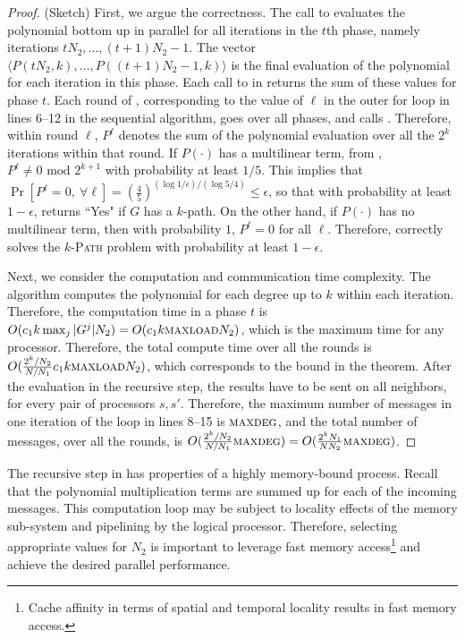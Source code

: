 \begin{proof} (Sketch)
First, we argue the correctness. 
The call to \parcircuitpath{} evaluates the polynomial bottom up in parallel for all iterations in the
$t$th phase, namely iterations $tN_2,\ldots,(t+1)N_2-1$. The vector
$\langle P(tN_2, k),  \ldots ,P((t+1)N_2-1, k)\rangle$
is the final evaluation of the polynomial for each iteration in this phase.
Each call to \parcircuitpath{} in \ouralgo{}
returns the sum of these values for phase $t$.
Each round of \ouralgo{}, corresponding to the value of
$\ell$ in the outer for loop in lines 6--12 in the sequential algorithm, goes over all phases, and
calls \parcircuitpath{}. Therefore, within round $\ell$, $P^{\ell}$ denotes the
sum of the polynomial evaluation over all the $2^k$ iterations within that round.
If $P(\cdot)$ has a multilinear term,
from \cite{koutis:icalp08,williams2009finding}, $P^{\ell}\neq 0 \text{ mod }2^{k+1}$ with
probability at least $1/5$. This implies that 
$\Pr[P^{\ell} = 0,\ \forall \ell] = (\frac{4}{5})^{(\log{1/\epsilon})/(\log{5/4})}\leq\epsilon$,
so that with probability at least $1-\epsilon$, \ouralgo{} returns ``Yes" if $G$ has a $k$-path.  On the other hand,
if $P(\cdot)$ has no multilinear term, then with probability $1$, $P^{\ell}=0$ for all $\ell$.
Therefore, \ouralgo{} correctly solves the \textsc{$k$-Path} problem with probability
at least $1-\epsilon$.

Next, we consider the computation and communication time complexity. 
The algorithm \parcircuitpath{} computes the polynomial for each degree up to $k$ within each iteration.
Therefore, the computation time in a phase $t$ is 
$O(c_1 k \max_j |G^j| N_2) = O(c_1k\textsc{maxload}{}N_2)$, which is the maximum time for any processor. Therefore, the total compute time over all the rounds is
$O(\frac{2^k/N_2}{N/N_1} c_1 k \textsc{maxload}{} N_2)$, which corresponds to the bound in the theorem.
After the evaluation in the recursive step, the results have to be sent on all neighbors, for every pair of
processors $s, s'$. Therefore, the maximum number of messages in one iteration of the loop in lines 8--15 is $\textsc{maxdeg}{}$, and the total number of messages, over all the rounds, is
$O(\frac{2^k/N_2}{N/N_1} \textsc{maxdeg}{}) = O(\frac{2^kN_1}{N N_2} \textsc{maxdeg}{})$.
\end{proof}

The recursive step in \parcircuitpath{} has properties of a highly memory-bound process. Recall that the polynomial multiplication terms are summed up for each of the incoming messages. This computation loop may be subject to locality effects of the memory sub-system and pipelining by the logical processor. Therefore, selecting appropriate values for $N_2$ is important to leverage fast memory access\footnote{Cache affinity in terms of spatial and temporal locality results in fast memory access.} and achieve the desired parallel performance.

